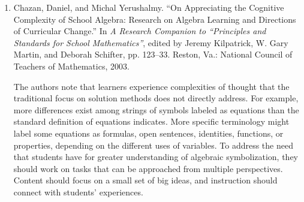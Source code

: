\documentclass[
  10pt,
  a4paper,
  landscape,
  twoside,
  openany
]{scrbook}
\newcounter{example}
\begin{document}
{{\begin{enumerate}
      This article contains three examples of functions that address different forms of mathematical knowledge. A weight-loss example addresses graphical interpretation and data generation. An iced-tea example addresses verbal pattern description. An allowance example addresses qualitative graphical construction. The authors emphasize the point that the ability to interpret and translate representations can help students construct mental images of patterns and functions and thus extend their algebraic thinking. A deeper interpretation based on familiar events and problem solving can broaden students' understanding of conventional representations beyond mere manipulation. Furthermore, asking a student to interpret a concept by using a representation different from the one with which it is initially presented is one way to determine students' understanding.

    \item Chazan, Daniel, and Michal Yerushalmy. “On Appreciating the Cognitive Complexity of School Algebra: Research on Algebra Learning and Directions of Curricular Change.” In \emph{A Research Companion to ``Principles and Standards for School Mathematics''}, edited by Jeremy Kilpatrick, W. Gary Martin, and Deborah Schifter, pp. 123--33. Reston, Va.: National Council of Teachers of Mathematics, 2003.

      The authors note that learners experience complexities of thought that the traditional focus on solution methods does not directly address. For example, more differences exist among strings of symbols labeled as equations than the standard definition of equations indicates. More specific terminology might label some equations as formulas, open sentences, identities, functions, or properties, depending on the different uses of variables. To address the need that students have for greater understanding of algebraic symbolization, they should work on tasks that can be approached from multiple perspectives. Content should focus on a small set of big ideas, and instruction should connect with students' experiences.
  \end{enumerate}
}
}
\end{document}
